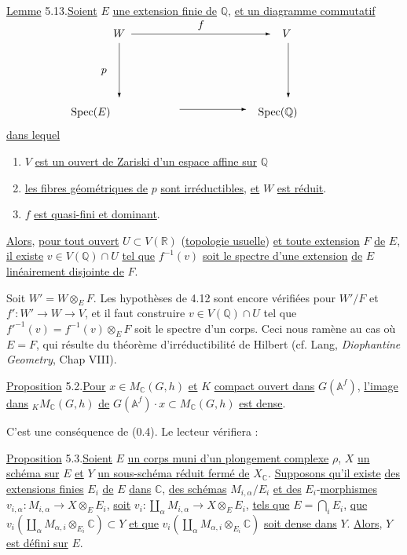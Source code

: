 \documentclass[10pt]{article}
\newcommand{\Af}{\mathbb A^f}
\newcommand{\C}{\mathbb C}
\newcommand{\Q}{\mathbb Q}
\newcommand{\R}{\mathbb R}
\newcommand{\MC}{M_{\C}}
\newcommand{\Spec}{\operatorname{Spec}}
\begin{document}
\noindent \uline{Lemme} 5.13.\quad \uline{Soient} $E$ \uline{une extension finie de} $\Q$, \uline{et un diagramme commutatif}
\[
\begingroup
\setlength{\unitlength}{0.55em}
\begin{picture}(58,15)
\put(14,13){\(W\)}
\put(42,13){\(V\)}
\put(7,0){\(\Spec(E)\)}
\put(38,0){\(\Spec(\Q)\)}
\put(17,13.5){\vector(1,0){23}}
\put(28,14.5){\(f\)}
\put(15,12){\vector(0,-1){9}}
\put(12,7){\(p\)}
\put(43,12){\vector(0,-1){9}}
\put(25,1){\vector(1,0){11}}
\end{picture}
\endgroup
\]
\uline{dans lequel}
\begin{enumerate}[label=(\roman*)]
\item $V$ \uline{est un ouvert de Zariski d'un espace affine sur} $\Q$
\item \uline{les fibres géométriques de} $p$ \uline{sont irréductibles}, \uline{et} $W$ \uline{est réduit}.
\item $f$ \uline{est quasi-fini et dominant}.
\end{enumerate}
\uline{Alors}, \uline{pour tout ouvert} $U\subset V(\R)$ (\uline{topologie usuelle}) \uline{et toute extension} $F$ \uline{de} $E$, \uline{il existe} $v\in V(\Q)\cap U$ \uline{tel que} $f^{-1}(v)$ \uline{soit le spectre d'une extension} \uline{de} $E$ \uline{linéairement disjointe de} $F$.

Soit $W'=W\otimes_EF$. Les hypothèses de 4.12 sont encore vérifiées pour $W'/F$ et $f':W'\longrightarrow W\longrightarrow V$, et il faut construire $v\in V(\Q)\cap U$ tel que $f'^{-1}(v)=f^{-1}(v)\otimes_EF$ soit le spectre d'un corps. Ceci nous ramène au cas où $E=F$, qui résulte du théorème d'irréductibilité de Hilbert (cf. Lang, \emph{Diophantine Geometry}, Chap VIII).

\noindent \uline{Proposition} 5.2.\quad \uline{Pour} $x\in\MC(G,h)$ \uline{et} $K$ \uline{compact ouvert dans} $G(\Af)$, \uline{l'image} \uline{dans} ${}_K\MC(G,h)$ \uline{de} $G(\Af)\cdot x\subset\MC(G,h)$ \uline{est dense}.

C'est une conséquence de (0.4). Le lecteur vérifiera :

\noindent \uline{Proposition} 5.3.\quad \uline{Soient} $E$ \uline{un corps muni d'un plongement complexe} $\rho$, $X$ \uline{un schéma sur} $E$ \uline{et} $Y$ \uline{un sous-schéma réduit fermé de} $X_{\C}$. \uline{Supposons qu'il existe} \uline{des extensions finies} $E_i$ \uline{de} $E$ \uline{dans} $\C$, \uline{des schémas} $M_{i,\alpha}/E_i$ \uline{et des} $E_i$-\uline{morphismes} $v_{i,\alpha}:M_{i,\alpha}\longrightarrow X\otimes_EE_i$, \uline{soit} $v_i:\coprod_\alpha M_{i,\alpha}\longrightarrow X\otimes_EE_i$, \uline{tels que} $E=\bigcap_i E_i$, \uline{que} $v_i(\coprod_\alpha M_{\alpha,i}\otimes_{E_i}\C)\subset Y$ \uline{et que} $v_i(\coprod_\alpha M_{\alpha,i}\otimes_{E_i}\C)$ \uline{soit dense dans} $Y$. \uline{Alors}, $Y$ \uline{est défini sur} $E$.
\end{document}
